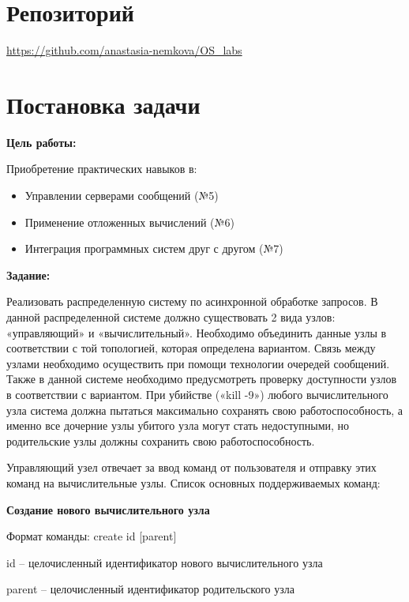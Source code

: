 \documentclass[a4paper, 14pt]{article}
\begin{document}
\section*{Репозиторий}   
\vspace{2ex}
\url{https://github.com/anastasia-nemkova/OS_labs}

\section*{Постановка задачи}   
\textbf{Цель работы:}
\vspace{2ex}

Приобретение практических навыков в:
\begin{itemize}
    \item Управлении серверами сообщений (№5)
    \item Применение отложенных вычислений (№6)
    \item Интеграция программных систем друг с другом (№7)
\end{itemize}

\vspace{4ex}
\textbf{Задание:}
\vspace{2ex}

Реализовать распределенную систему по асинхронной обработке запросов. В данной  распределенной системе должно существовать 2 вида узлов: «управляющий» и «вычислительный». Необходимо объединить данные узлы в соответствии с той топологией, которая определена вариантом. Связь между узлами необходимо осуществить при помощи технологии очередей сообщений. Также в данной системе необходимо предусмотреть проверку доступности узлов в соответствии с вариантом. При убийстве («kill -9») любого вычислительного узла система должна пытаться максимально сохранять свою работоспособность, а именно все дочерние узлы убитого узла могут стать недоступными, но родительские узлы должны сохранить свою работоспособность.

Управляющий узел отвечает за ввод команд от пользователя и отправку этих команд на вычислительные узлы. Список основных поддерживаемых команд:\newline

\textbf{Создание нового вычислительного узла}

Формат команды: create id [parent]

id – целочисленный идентификатор нового вычислительного узла

parent – целочисленный идентификатор родительского узла
\end{document}

